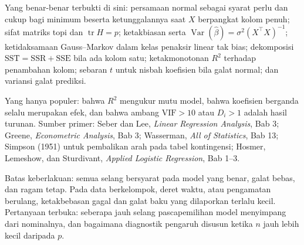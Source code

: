 \begin{untukpeneliti}
Yang benar-benar terbukti di sini: persamaan normal sebagai syarat perlu dan cukup bagi
minimum beserta ketunggalannya saat $X$ berpangkat kolom penuh; sifat matriks topi dan
$\operatorname{tr}H=p$; ketakbiasan serta
$\operatorname{Var}(\hat\beta)=\sigma^2(X^{\top}X)^{-1}$; ketidaksamaan Gauss--Markov
dalam kelas penaksir linear tak bias; dekomposisi $\mathrm{SST}=\mathrm{SSR}+\mathrm{SSE}$
bila ada kolom satu; ketakmonotonan $R^2$ terhadap penambahan kolom; sebaran $t$ untuk
nisbah koefisien bila galat normal; dan variansi galat prediksi.

Yang hanya populer: bahwa $R^2$ mengukur mutu model, bahwa koefisien berganda selalu
merupakan efek, dan bahwa ambang $\mathrm{VIF}>10$ atau $D_i>1$ adalah hasil turunan.
Sumber primer: Seber dan Lee, \emph{Linear Regression Analysis}, Bab 3; Greene,
\emph{Econometric Analysis}, Bab 3; Wasserman, \emph{All of Statistics}, Bab 13;
Simpson (1951) untuk pembalikan arah pada tabel kontingensi; Hosmer, Lemeshow, dan
Sturdivant, \emph{Applied Logistic Regression}, Bab 1--3.

Batas keberlakuan: semua selang bersyarat pada model yang benar, galat bebas, dan ragam
tetap. Pada data berkelompok, deret waktu, atau pengamatan berulang, ketakbebasan gagal
dan galat baku yang dilaporkan terlalu kecil. Pertanyaan terbuka: seberapa jauh selang
pascapemilihan model menyimpang dari nominalnya, dan bagaimana diagnostik pengaruh
disusun ketika $n$ jauh lebih kecil daripada $p$.
\end{untukpeneliti}

